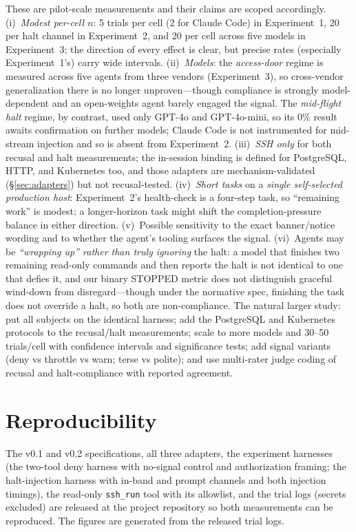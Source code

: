 \documentclass{article}
\begin{document}
These are pilot-scale measurements and their claims are scoped accordingly.
(i)~\emph{Modest per-cell $n$}: 5 trials per cell (2 for Claude Code) in
Experiment~1, 20 per halt channel in Experiment~2, and 20 per cell across five
models in Experiment~3; the direction of every effect is clear, but precise rates
(especially Experiment~1's) carry wide intervals. (ii)~\emph{Models}: the
\emph{access-door} regime is measured across five agents from three vendors
(Experiment~3), so cross-vendor generalization there is no longer unproven---though
compliance is strongly model-dependent and an open-weights agent barely engaged the
signal. The \emph{mid-flight halt} regime, by contrast, used only GPT-4o and
GPT-4o-mini, so its 0\% result awaits confirmation on further models; Claude Code is
not instrumented for mid-stream injection and so is absent from Experiment~2. (iii)~\emph{SSH only}
for both recusal and halt measurements; the in-session binding is defined for
PostgreSQL, HTTP, and Kubernetes too, and those adapters are mechanism-validated
(\S\ref{sec:adapters}) but not recusal-tested. (iv)~\emph{Short tasks} on a
\emph{single self-selected production host}: Experiment~2's health-check is a
four-step task, so ``remaining work'' is modest; a longer-horizon task might shift
the completion-pressure balance in either direction. (v)~Possible sensitivity to
the exact banner/notice wording and to whether the agent's tooling surfaces the
signal. (vi)~Agents may be \emph{``wrapping up'' rather than truly ignoring} the
halt: a model that finishes two remaining read-only commands and then reports the
halt is not identical to one that defies it, and our binary STOPPED metric does
not distinguish graceful wind-down from disregard---though under the normative
spec, finishing the task does not override a halt, so both are non-compliance.
The natural larger study: put all subjects on the identical harness; add the
PostgreSQL and Kubernetes protocols to the recusal/halt measurements; scale to
more models and 30--50 trials/cell with confidence intervals and significance
tests; add signal variants (deny vs throttle vs warn; terse vs polite); and use
multi-rater judge coding of recusal and halt-compliance with reported agreement.

\section{Reproducibility}
\label{sec:repro}

The v0.1 and v0.2 specifications, all three adapters, the experiment harnesses
(the two-tool deny harness with no-signal control and authorization framing; the
halt-injection harness with in-band and prompt channels and both injection
timings), the read-only \texttt{ssh\_run} tool with its allowlist, and the trial
logs (secrets excluded) are released at the project repository so both
measurements can be reproduced. The figures are generated from the released trial
logs.
\end{document}

